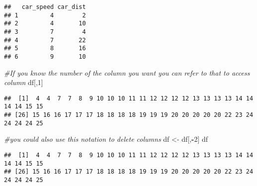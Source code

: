 \documentclass[
]{article}
\newenvironment{Shaded}{\begin{snugshade}}{\end{snugshade}}
\newcommand{\CommentTok}[1]{\textcolor[rgb]{0.56,0.35,0.01}{\textit{#1}}}
\newcommand{\DecValTok}[1]{\textcolor[rgb]{0.00,0.00,0.81}{#1}}
\newcommand{\NormalTok}[1]{#1}
\newcommand{\OperatorTok}[1]{\textcolor[rgb]{0.81,0.36,0.00}{\textbf{#1}}}
\newcommand{\StringTok}[1]{\textcolor[rgb]{0.31,0.60,0.02}{#1}}
\begin{document}
\begin{verbatim}
##   car_speed car_dist
## 1         4        2
## 2         4       10
## 3         7        4
## 4         7       22
## 5         8       16
## 6         9       10
\end{verbatim}

\begin{Shaded}
\begin{Highlighting}[]
\CommentTok{#If you know the number of the column you want you can refer to that to access column}
\NormalTok{df[,}\DecValTok{1}\NormalTok{]}
\end{Highlighting}
\end{Shaded}

\begin{verbatim}
##  [1]  4  4  7  7  8  9 10 10 10 11 11 12 12 12 12 13 13 13 13 14 14 14 14 15 15
## [26] 15 16 16 17 17 17 18 18 18 18 19 19 19 20 20 20 20 20 22 23 24 24 24 24 25
\end{verbatim}

\begin{Shaded}
\begin{Highlighting}[]
\CommentTok{#you could also use this notation to delete columns}
\NormalTok{df <-}\StringTok{ }\NormalTok{df[,}\OperatorTok{-}\DecValTok{2}\NormalTok{]}
\NormalTok{df}
\end{Highlighting}
\end{Shaded}

\begin{verbatim}
##  [1]  4  4  7  7  8  9 10 10 10 11 11 12 12 12 12 13 13 13 13 14 14 14 14 15 15
## [26] 15 16 16 17 17 17 18 18 18 18 19 19 19 20 20 20 20 20 22 23 24 24 24 24 25
\end{verbatim}
\end{document}
